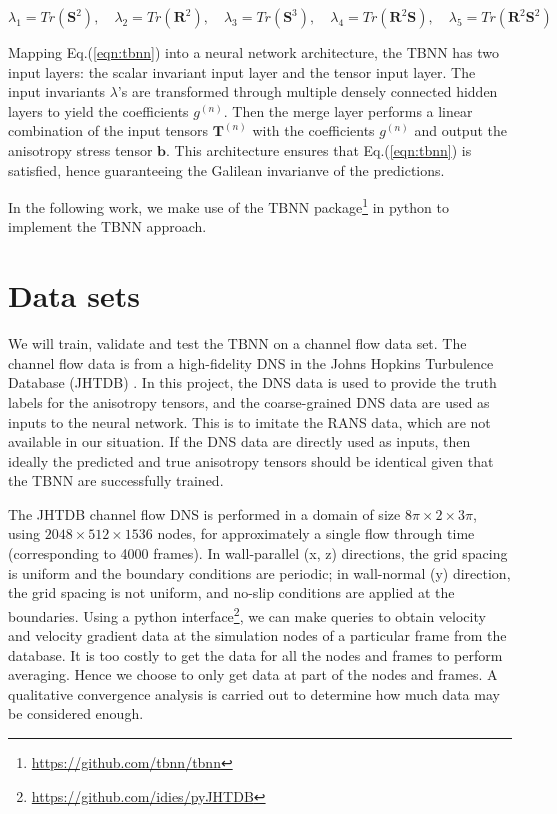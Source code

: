 \documentclass{article}
\numberwithin{equation}{section}
\begin{document}
\begin{equation}
    \lambda_1 = Tr(\mathbf{S}^2), \quad
    \lambda_2 = Tr(\mathbf{R}^2), \quad
    \lambda_3 = Tr(\mathbf{S}^3), \quad
    \lambda_4 = Tr(\mathbf{R}^2\mathbf{S}), \quad
    \lambda_5 = Tr(\mathbf{R}^2\mathbf{S}^2)
    \label{eqn:invariants}
\end{equation}


Mapping Eq.(\ref{eqn:tbnn}) into a neural network architecture, the TBNN has two input layers: the scalar invariant input layer and the tensor input layer. The input invariants $\lambda$'s are transformed through multiple densely connected hidden layers to yield the coefficients $g^{(n)}$. Then the merge layer performs a linear combination of the input tensors $\mathbf{T}^{(n)}$ with the coefficients $g^{(n)}$ and output the anisotropy stress tensor $\mathbf{b}$. This architecture ensures that Eq.(\ref{eqn:tbnn}) is satisfied, hence guaranteeing the Galilean invarianve of the predictions. 

In the following work, we make use of the TBNN package\footnote{\url{https://github.com/tbnn/tbnn}} in python to implement the TBNN approach. 

\section{Data sets}

We will train, validate and test the TBNN on a channel flow data set. The channel flow data is from a high-fidelity DNS in the Johns Hopkins Turbulence Database (JHTDB) \cite{li2008public}. In this project, the DNS data is used to provide the truth labels for the anisotropy tensors, and the coarse-grained DNS data are used as inputs to the neural network. This is to imitate the RANS data, which are not available in our situation. If the DNS data are directly used as inputs, then ideally the predicted and true anisotropy tensors should be identical given that the TBNN are successfully trained.

The JHTDB channel flow DNS is performed in a domain of size $8\pi \times 2 \times 3\pi $, using $2048\times512\times1536$ nodes, for approximately a single flow through time (corresponding to 4000 frames). In wall-parallel (x, z) directions, the grid spacing is uniform and the boundary conditions are periodic; in wall-normal (y) direction, the grid spacing is not uniform, and no-slip conditions are applied at the boundaries. Using a python interface\footnote{\url{https://github.com/idies/pyJHTDB}}, we can make queries to obtain velocity and velocity gradient data at the simulation nodes of a particular frame from the database. It is too costly to get the data for all the nodes and frames to perform averaging. Hence we choose to only get data at part of the nodes and frames. A qualitative convergence analysis is carried out to determine how much data may be considered enough. 
\end{document}
